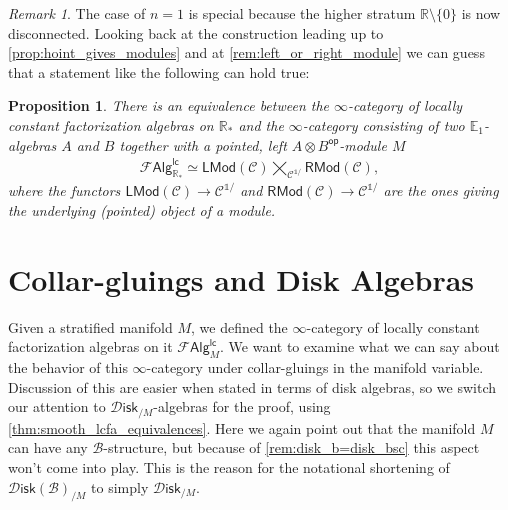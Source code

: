 \documentclass[12pt,a4paper]{article}
\newcounter{counter} \numberwithin{counter}{section}
\theoremstyle{definition}
\theoremstyle{plain}
\newtheorem{proposition}[counter]{Proposition}
\theoremstyle{remark}
\newtheorem{remark}[counter]{Remark}
\newcommand{\catC}{\mathscr{C}}
\newcommand{\lcfa}{\mathscr{F} \mathsf{Alg}^{\mathsf{lc}}}
\newcommand{\disk}{\mathscr{D} \mathsf{isk}}
\newcommand{\bstr}{\mathscr{B}}
\begin{document}
\begin{remark}
    The case of $n=1$ is special because the higher stratum $\mathbb{R} \setminus \{0\}$ is now disconnected. Looking back at the construction leading up to \cref{prop:hoint_gives_modules} and at \cref{rem:left_or_right_module} we can guess that a statement like the following can hold true:
\end{remark}

\begin{proposition}
    There is an equivalence between the $\infty$-category of locally constant factorization algebras on $\mathbb{R}_*$ and the $\infty$-category consisting of two $\mathbb{E}_1$-algebras $A$ and $B$ together with a pointed, left $A \otimes B^\mathsf{op}$-module $M$
    \begin{align}
        \lcfa_{\mathbb{R}_*} \simeq \mathsf{LMod} (\catC) \bigtimes_{\catC^{\mathbb{1}/}} \mathsf{RMod} (\catC),
    \end{align}
    where the functors $\mathsf{LMod}(\catC) \rightarrow \catC^{\mathbb{1}/}$ and $\mathsf{RMod}(\catC) \rightarrow \catC^{\mathbb{1}/}$ are the ones giving the underlying (pointed) object of a module.
\end{proposition}



















\section{Collar-gluings and Disk Algebras}\label{ch:gluing_disk_alg}

Given a stratified manifold $M$, we defined the $\infty$-category of locally constant factorization algebras on it $\lcfa_M$. We want to examine what we can say about the behavior of this $\infty$-category under collar-gluings in the manifold variable. Discussion of this are easier when stated in terms of disk algebras, so we switch our attention to $\disk_{/M}$-algebras for the proof, using \cref{thm:smooth_lcfa_equivalences}. Here we again point out that the manifold $M$ can have any $\bstr$-structure, but because of \cref{rem:disk_b=disk_bsc} this aspect won't come into play. This is the reason for the notational shortening of $\disk(\bstr)_{/M}$ to simply $\disk_{/M}$.
\end{document}
